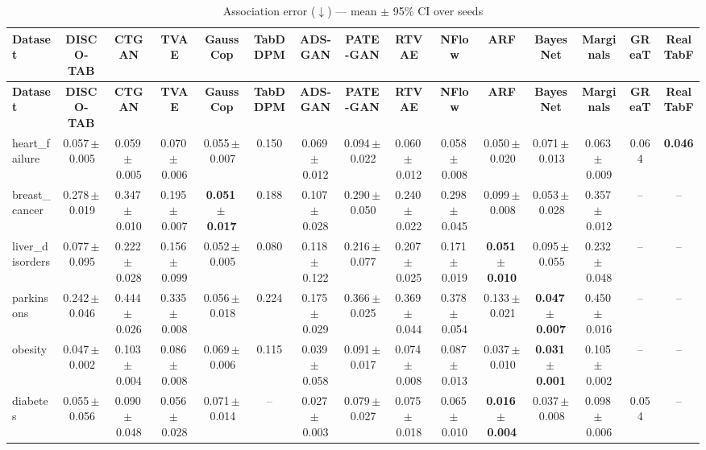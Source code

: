 \documentclass[8pt]{extarticle}
\begin{document}
\begin{longtable}{l*{14}{c}}
\caption{Association error ($\downarrow$) --- mean $\pm$ 95\% CI over seeds}\\
\toprule
\textbf{Dataset} & \textbf{DISCO-TAB} & \textbf{CTGAN} & \textbf{TVAE} & \textbf{GaussCop} & \textbf{TabDDPM} & \textbf{ADS-GAN} & \textbf{PATE-GAN} & \textbf{RTVAE} & \textbf{NFlow} & \textbf{ARF} & \textbf{BayesNet} & \textbf{Marginals} & \textbf{GReaT} & \textbf{RealTabF} \\
\midrule
\endfirsthead
\toprule
\textbf{Dataset} & \textbf{DISCO-TAB} & \textbf{CTGAN} & \textbf{TVAE} & \textbf{GaussCop} & \textbf{TabDDPM} & \textbf{ADS-GAN} & \textbf{PATE-GAN} & \textbf{RTVAE} & \textbf{NFlow} & \textbf{ARF} & \textbf{BayesNet} & \textbf{Marginals} & \textbf{GReaT} & \textbf{RealTabF} \\
\midrule
\endhead
\bottomrule
\endfoot
heart\_failure & 0.057\,$\pm$\,0.005 & 0.059\,$\pm$\,0.005 & 0.070\,$\pm$\,0.006 & 0.055\,$\pm$\,0.007 & 0.150 & 0.069\,$\pm$\,0.012 & 0.094\,$\pm$\,0.022 & 0.060\,$\pm$\,0.012 & 0.058\,$\pm$\,0.008 & 0.050\,$\pm$\,0.020 & 0.071\,$\pm$\,0.013 & 0.063\,$\pm$\,0.009 & 0.064 & \textbf{0.046} \\
breast\_cancer & 0.278\,$\pm$\,0.019 & 0.347\,$\pm$\,0.010 & 0.195\,$\pm$\,0.007 & \textbf{0.051\,$\pm$\,0.017} & 0.188 & 0.107\,$\pm$\,0.028 & 0.290\,$\pm$\,0.050 & 0.240\,$\pm$\,0.022 & 0.298\,$\pm$\,0.045 & 0.099\,$\pm$\,0.008 & 0.053\,$\pm$\,0.028 & 0.357\,$\pm$\,0.012 & -- & -- \\
liver\_disorders & 0.077\,$\pm$\,0.095 & 0.222\,$\pm$\,0.028 & 0.156\,$\pm$\,0.099 & 0.052\,$\pm$\,0.005 & 0.080 & 0.118\,$\pm$\,0.122 & 0.216\,$\pm$\,0.077 & 0.207\,$\pm$\,0.025 & 0.171\,$\pm$\,0.019 & \textbf{0.051\,$\pm$\,0.010} & 0.095\,$\pm$\,0.055 & 0.232\,$\pm$\,0.048 & -- & -- \\
parkinsons & 0.242\,$\pm$\,0.046 & 0.444\,$\pm$\,0.026 & 0.335\,$\pm$\,0.008 & 0.056\,$\pm$\,0.018 & 0.224 & 0.175\,$\pm$\,0.029 & 0.366\,$\pm$\,0.025 & 0.369\,$\pm$\,0.044 & 0.378\,$\pm$\,0.054 & 0.133\,$\pm$\,0.021 & \textbf{0.047\,$\pm$\,0.007} & 0.450\,$\pm$\,0.016 & -- & -- \\
obesity & 0.047\,$\pm$\,0.002 & 0.103\,$\pm$\,0.004 & 0.086\,$\pm$\,0.008 & 0.069\,$\pm$\,0.006 & 0.115 & 0.039\,$\pm$\,0.058 & 0.091\,$\pm$\,0.017 & 0.074\,$\pm$\,0.008 & 0.087\,$\pm$\,0.013 & 0.037\,$\pm$\,0.010 & \textbf{0.031\,$\pm$\,0.001} & 0.105\,$\pm$\,0.002 & -- & -- \\
diabetes & 0.055\,$\pm$\,0.056 & 0.090\,$\pm$\,0.048 & 0.056\,$\pm$\,0.028 & 0.071\,$\pm$\,0.014 & -- & 0.027\,$\pm$\,0.003 & 0.079\,$\pm$\,0.027 & 0.075\,$\pm$\,0.018 & 0.065\,$\pm$\,0.010 & \textbf{0.016\,$\pm$\,0.004} & 0.037\,$\pm$\,0.008 & 0.098\,$\pm$\,0.006 & 0.054 & -- \\

\end{longtable}
\end{document}
